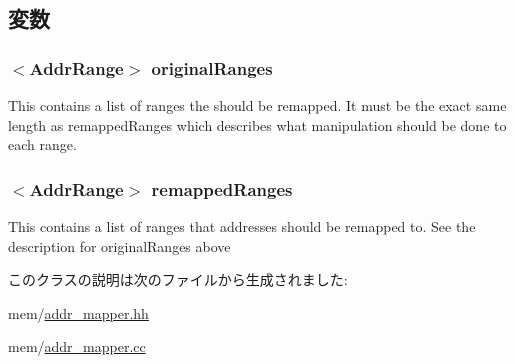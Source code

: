 \subsection{変数}
\hypertarget{classRangeAddrMapper_a55137437ddf514203433b70c0c435aa0}{
\subsubsection[{originalRanges}]{$<${\bf AddrRange}$>$ {\bf originalRanges}}}
\label{classRangeAddrMapper_a55137437ddf514203433b70c0c435aa0}
This contains a list of ranges the should be remapped. It must be the exact same length as remappedRanges which describes what manipulation should be done to each range. \hypertarget{classRangeAddrMapper_aa478e59bbb23c79ab49039bfc312ab8e}{
\subsubsection[{remappedRanges}]{$<${\bf AddrRange}$>$ {\bf remappedRanges}}}
\label{classRangeAddrMapper_aa478e59bbb23c79ab49039bfc312ab8e}
This contains a list of ranges that addresses should be remapped to. See the description for originalRanges above 

このクラスの説明は次のファイルから生成されました:\begin{DoxyCompactItemize}
\item 
mem/\hyperlink{addr__mapper_8hh}{addr\_\-mapper.hh}\item 
mem/\hyperlink{addr__mapper_8cc}{addr\_\-mapper.cc}\end{DoxyCompactItemize}
